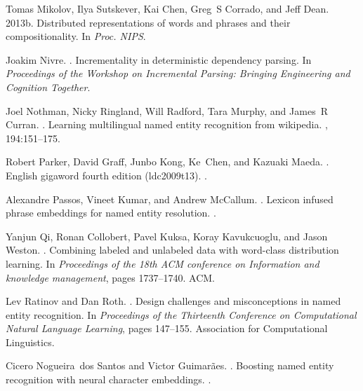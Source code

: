 \documentclass[11pt,letterpaper]{article}
\begin{document}
\begin{thebibliography}{}
Tomas Mikolov, Ilya Sutskever, Kai Chen, Greg~S Corrado, and Jeff Dean.
\newblock 2013b.
\newblock Distributed representations of words and phrases and their
  compositionality.
\newblock In {\em Proc. NIPS}.

Joakim Nivre.
.
\newblock Incrementality in deterministic dependency parsing.
\newblock In {\em Proceedings of the Workshop on Incremental Parsing: Bringing
  Engineering and Cognition Together}.

Joel Nothman, Nicky Ringland, Will Radford, Tara Murphy, and James~R Curran.
.
\newblock Learning multilingual named entity recognition from wikipedia.
, 194:151--175.

Robert Parker, David Graff, Junbo Kong, Ke~Chen, and Kazuaki Maeda.
.
\newblock English gigaword fourth edition (ldc2009t13).
.

Alexandre Passos, Vineet Kumar, and Andrew McCallum.
.
\newblock Lexicon infused phrase embeddings for named entity resolution.
.

Yanjun Qi, Ronan Collobert, Pavel Kuksa, Koray Kavukcuoglu, and Jason Weston.
.
\newblock Combining labeled and unlabeled data with word-class distribution
  learning.
\newblock In {\em Proceedings of the 18th ACM conference on Information and
  knowledge management}, pages 1737--1740. ACM.

Lev Ratinov and Dan Roth.
.
\newblock Design challenges and misconceptions in named entity recognition.
\newblock In {\em Proceedings of the Thirteenth Conference on Computational
  Natural Language Learning}, pages 147--155. Association for Computational
  Linguistics.

Cicero Nogueira~dos Santos and Victor Guimar{\~a}es.
.
\newblock Boosting named entity recognition with neural character embeddings.
.


\end{thebibliography}
\end{document}
